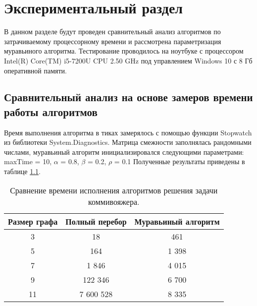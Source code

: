 \chapter{Экспериментальный раздел}
\label{cha:research}
    В данном разделе будут проведен  
    сравнительный анализ алгоритмов по затрачиваемому процессорному 
    времени и рассмотрена параметризация муравьиного алгоритма.
    Тестирование проводилось на ноутбуке с процессором
    Intel(R) Core(TM) i5-7200U CPU 2.50 GHz \cite{proc}
    под управлением Windows 10 с 8 Гб оперативной памяти.

    \section{Сравнительный анализ на основе замеров времени работы алгоритмов}
        Время выполнения алгоритма в тиках замерялось с помощью функции Stopwatch
        из библиотеки System.Diagnostics.
        Матрица смежности заполнялась рандомными числами,
        муравьиный алгоритм инициализировался следующими параметрами:
        maxTime = 10, $\alpha$ = 0.8, $\beta$ = 0.2, $\rho$ = 0.1
        Полученные результаты приведены в таблице \ref{table:test:time}.
        
        \begin{table}[h!]
            \begin{center}
                \begin{tabular}{|c|c|c|}
                    \hline
                    Размер графа & Полный перебор & Муравьиный алгоритм \\ \hline
                    3            & 18             & 461             \\ \hline
                    5            & 164            & 1 398           \\ \hline
                    7            & 1 846          & 4 015           \\ \hline
                    9            & 122 346        & 6 700           \\ \hline
                    11           & 7 600 528      & 8 335           \\ 
                    \hline
                \end{tabular}
            \end{center}
            \caption{Сравнение времени исполнения алгоритмов решения задачи коммивояжера.}
            \label{table:test:time}
        \end{table}      
        
